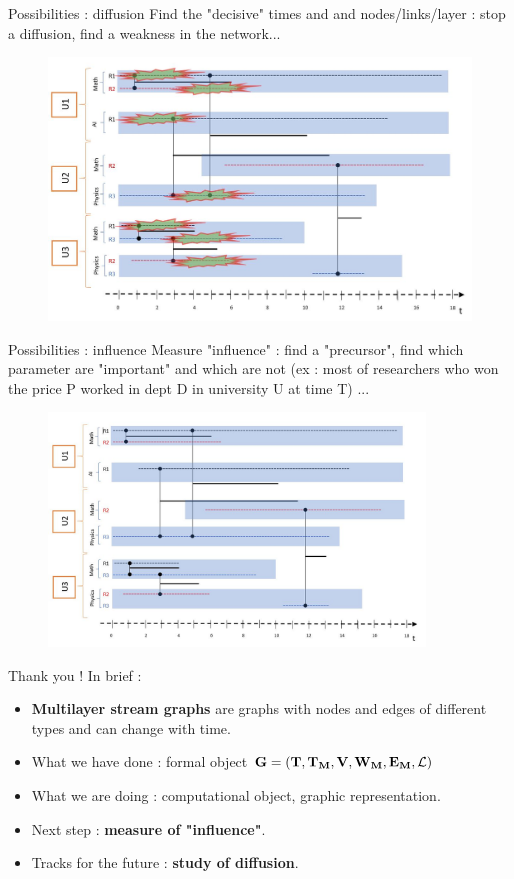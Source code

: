 \documentclass[15pt]{beamer}
\begin{document}
\begin{frame}{Possibilities : diffusion} %
Find the "decisive" times and and nodes/links/layer : stop a diffusion, find a weakness in the network...
\begin{figure}
	\centering
    \includegraphics[width=\linewidth]{img/epidemiet1.jpg}
    \label{fig:chercheurs}	
\end{figure}
\end{frame}


\begin{frame}{Possibilities : influence}%
	Measure "influence" : find a "precursor", find which parameter are "important" and which are not (ex : most of researchers who won the price P worked in dept D in university U at time T) ...
	\begin{figure}
		\centering
		\includegraphics[width=10cm]{img/chercheurs.jpg}
		\label{influ}
	\end{figure}
\end{frame}



\begin{frame}{Thank you !}
	In brief :
	\begin{itemize}
		\item \textbf{Multilayer stream graphs} are graphs with nodes and edges of different types and can change with time.
		\item What we have done : formal object $\mathbf{G=(T,T_M,V,W_M,E_M,\cal{L})}$
		\item What we are doing : computational object, graphic representation.
		\item Next step : \textbf{measure of "influence"}.
		\item Tracks for the future : \textbf{study of diffusion}.
	\end{itemize}
	
\end{frame}
\end{document}
